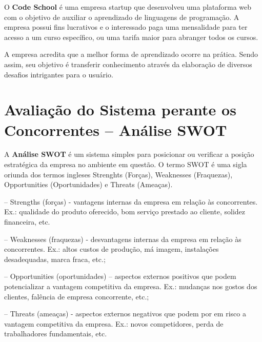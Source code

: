 \documentclass[graduacao,brazil]{ThesisPUC}
\begin{document}
O \textbf{Code School} \'{e} uma empresa startup que desenvolveu uma plataforma web com o objetivo de auxiliar
o aprendizado de linguagens de programa\c{c}\~{a}o. A empresa possui fins lucrativos e o interessado paga
uma mensalidade para ter acesso a um curso espec\'{i}fico, ou uma tarifa maior para abranger todos os cursos.

A empresa acredita que a melhor forma de aprendizado ocorre na pr\'{a}tica. Sendo assim, seu objetivo \'{e}
transferir conhecimento atrav\'{e}s da elabora\c{c}\~{a}o de diversos desafios intrigantes para o usu\'{a}rio.


\section{Avalia\c{c}\~{a}o do Sistema perante os Concorrentes -- An\'{a}lise SWOT}

A \textbf{An\'{a}lise SWOT} \cite{Fine09} \'{e} um sistema simples para posicionar ou verificar a
posi\c{c}\~{a}o estrat\'{e}gica da empresa no ambiente em quest\~{a}o. O termo SWOT \'{e} uma sigla
oriunda dos termos ingleses Strenghts (Forças), Weaknesses (Fraquezas), Opportunities (Oportunidades)
e Threats (Ameaças).

-- Strengths (forças) - vantagens internas da empresa em relação às concorrentes. Ex.:
qualidade do produto oferecido, bom serviço prestado ao cliente, solidez financeira, etc.

-- Weaknesses (fraquezas) - desvantagens internas da empresa em relação às concorrentes.
Ex.: altos custos de produção, má imagem, instalações desadequadas, marca fraca, etc.;

-- Opportunities (oportunidades) – aspectos externos positivos que podem potencializar a
vantagem competitiva da empresa. Ex.: mudanças nos gostos dos clientes, falência de
empresa concorrente, etc.;

-- Threats (ameaças) - aspectos externos negativos que podem por em risco a vantagem
competitiva da empresa. Ex.: novos competidores, perda de trabalhadores fundamentais,
etc.
\end{document}
